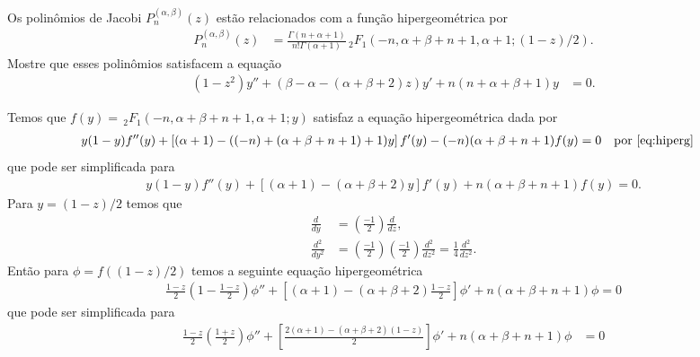 \documentclass[a4paper,12pt, leqno, answers]{exam}
\begin{document}
\begin{questions}
     Os polin\^{o}mios de Jacobi $P_n^{(\alpha, \beta)}(z)$ est\~{a}o relacionados com a fun\c{c}\~{a}o hipergeom\'{e}trica por
    \begin{align*}
        P_n^{(\alpha, \beta)}(z) &= \frac{\Gamma(n + \alpha + 1)}{n! \Gamma(\alpha + 1)} \,_2F_1(-n, \alpha + \beta + n + 1, \alpha + 1; (1 - z) / 2).
    \end{align*}
    Mostre que esses polinômios satisfacem a equa\c{c}\~{a}o
    \begin{align*}
        (1 - z^2) y'' + (\beta - \alpha - (\alpha + \beta + 2)z)y' + n(n + \alpha + \beta + 1)y &= 0.
    \end{align*}
    \begin{solution}
        Temos que $f(y) = \,_2F_1(-n, \alpha + \beta + n + 1, \alpha + 1; y)$ satisfaz a equa\c{c}\~{a}o hipergeom\'{e}trica dada por
        \begin{align*}
            y (1 - y) f''(y) + \left[ (\alpha + 1) - ( (-n) + (\alpha + \beta + n + 1) + 1)y \right] f'(y) - (-n) (\alpha + \beta + n + 1) f(y) &= 0 && \text{por \eqref{eq:hiperg}}
        \end{align*}
        que pode ser simplificada para
        \begin{align*}
            y (1 - y) f''(y) + \left[ (\alpha + 1) - (\alpha + \beta + 2)y \right] f'(y) + n (\alpha + \beta + n + 1) f(y) = 0.
        \end{align*}
        Para $y = (1 - z)/2$ temos que
        \begin{align}
            \frac{d}{dy} &= \left( \frac{-1}{2} \right) \frac{d}{dz}, \\
            \frac{d^2}{dy^2} &= \left( \frac{-1}{2} \right) \left( \frac{-1}{2} \right) \frac{d^2}{dz^2} = \frac{1}{4} \frac{d^2}{dz^2}.
        \end{align}
        Ent\~{a}o para $\phi = f( (1 - z)/2 )$ temos a seguinte equa\c{c}\~{a}o hipergeom\'{e}trica
        \begin{align*}
            \frac{1 - z}{2} \left( 1 - \frac{1 - z}{2} \right) \phi'' + \left[ (\alpha + 1) - (\alpha + \beta + 2) \frac{1 - z}{2} \right] \phi' + n (\alpha + \beta + n + 1) \phi = 0
        \end{align*}
        que pode ser simplificada para
        \begin{align*}
            \frac{1 - z}{2} \left( \frac{1 + z}{2} \right) \phi'' + \left[ \frac{2(\alpha + 1) - (\alpha + \beta + 2) (1 - z)}{2} \right] \phi' + n (\alpha + \beta + n + 1) \phi &= 0 \\

\end{align*}
\end{solution}
\end{questions}
\end{document}
